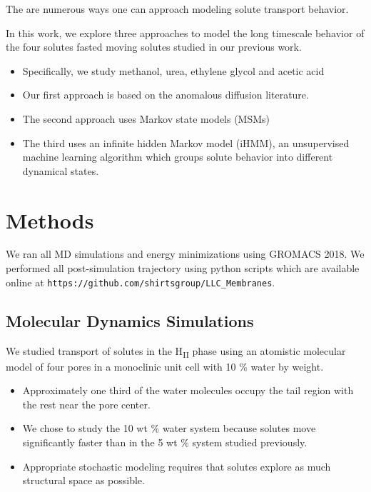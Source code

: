 \documentclass{article}
\begin{document}
  The are numerous ways one can approach modeling solute transport behavior.

  In this work, we explore three approaches to model the long timescale behavior
  of the four solutes fasted moving solutes studied in our previous work.
  \begin{itemize}
    \item Specifically, we study methanol, urea, ethylene glycol and acetic acid
  	\item Our first approach is based on the anomalous diffusion literature.
  	\item The second approach uses Markov state models (MSMs) 
  	\item The third uses an infinite hidden Markov model (iHMM), an unsupervised machine
  	learning algorithm which groups solute behavior into different dynamical states.
  \end{itemize}

  \section{Methods}
    
  We ran all MD simulations and energy minimizations using GROMACS 2018. We
  performed all post-simulation trajectory using python scripts which are available
  online at \texttt{https://github.com/shirtsgroup/LLC\_Membranes}.

  \subsection{Molecular Dynamics Simulations}

  We studied transport of solutes in the H\textsubscript{II} phase using an
  atomistic molecular model of four pores in a monoclinic unit cell with 
  10 \% water by weight. 
  \begin{itemize}
    \item Approximately one third of the water molecules occupy the tail region 
    with the rest near the pore center.
    \item We chose to study the 10 wt \% water system because solutes move 
    significantly faster than in the 5 wt \% system studied previously.
    \item Appropriate stochastic modeling requires that solutes explore 
    as much structural space as possible.  %
  \end{itemize}
  
\end{document}
